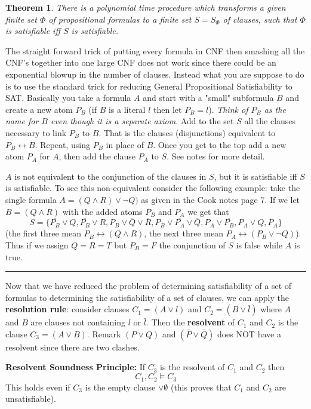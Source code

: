 \documentclass[twoside]{article}
\newcounter{lecnum}
\newtheorem{theorem}{Theorem}[lecnum]
\newenvironment{proof}{{\bf Proof:}}{\hfill\rule{2mm}{2mm}}
\begin{document}
\begin{theorem}
There is a polynomial time procedure which transforms a given finite set $\Phi$ of propositional formulas to a finite set $S = S_{\Phi}$ of clauses, such that $\Phi$ is satisfiable iff $S$ is satisfiable. 
\end{theorem}
\begin{proof}
The straight forward trick of putting every formula in CNF then smashing all the CNF's together into one large CNF does not work since there could be an exponential blowup in the number of clauses. Instead what you are suppose to do is to use the standard trick for reducing General Propositional Satisfiability to SAT. Basically you take a formula $A$ and start with a "small" subformula $B$ and create a new atom $P_B$ (if $B$ is a literal $l$ then let $P_B = l$). \emph{Think of $P_B$ as the name for $B$ even though it is a separate axiom}. Add to the set $S$ all the clauses necessary to link $P_B$ to $B$. That is the clauses (disjunctions) equivalent to $P_B \longleftrightarrow B$. Repeat, using $P_B$ in place of $B$. Once you get to the top add a new atom $P_A$ for $A$, then add the clause $P_A$ to $S$. See notes for more detail. 

$A$ is not equivalent to the conjunction of the clauses in $S$, but it is satisfiable iff $S$ is satisfiable. To see this non-equivalent consider the following example: take the single formula $A = (Q \land R) \lor \lnot Q)$ as given in the Cook notes page 7. If we let $B = (Q \land R)$ with the added atoms $P_B$ and $P_A$ we get that
\[S = \{\bar{P_B}\lor Q, \bar{P_B} \lor R, P_B \lor \bar{Q}\lor \bar{R}, P_B \lor \bar{P_A} \lor \bar{Q}, P_A \lor \bar{P_B}, P_A \lor Q, P_A\}\]
(the first three mean $P_B \longleftrightarrow (Q \land R)$, the next three mean $P_A \longleftrightarrow (P_B \lor \lnot Q)$). Thus if we assign $Q = R = T$ but $P_B = F$ the conjunction of $S$ is false while $A$ is true.  
\end{proof} 

Now that we have reduced the problem of determining satisfiability of a set of formulas to determining the satisfiability of a set of clauses, we can apply the \textbf{resolution rule}: consider clauses $C_1 = (A \lor l)$ and $C_2 = (B \lor \bar{l})$ where $A$ and $B$ are clauses not containing $l$ or $\bar{l}$. Then the \textbf{resolvent} of $C_1$ and $C_2$ is the clause $C_3 = (A \lor B)$. Remark $(P \lor Q)$ and $(\bar{P} \lor \bar{Q})$ does NOT have a resolvent since there are two clashes.

\textbf{Resolvent Soundness Principle:} If $C_3$ is the resolvent of $C_1$ and $C_2$ then
\[C_1, C_2 \vDash C_3\] 
This holds even if $C_3$ is the empty clause $\lor \emptyset$ (this proves that $C_1$ and $C_2$ are unsatisfiable).
\end{document}
